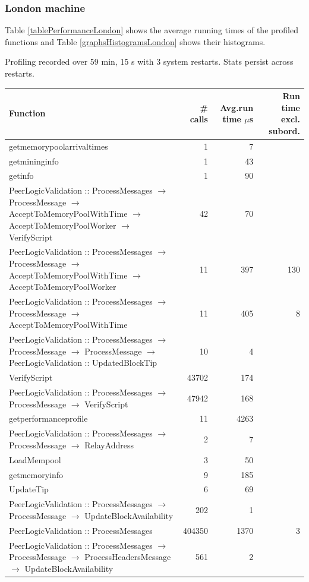 \documentclass{article}
\begin{document}
\subsubsection{London machine}
Table  \ref{tablePerformanceLondon} shows the average running times of the profiled functions and Table \ref{graphsHistogramsLondon} shows their histograms.
\begin{table}
	Profiling recorded over 59 min, 15 s with 3 system restarts. Stats persist across restarts.
	
	\begin{longtable}{P{8cm}|r|r|r}
		Function&\# calls& Avg.run time $\mu$s& Run time excl. subord. \\\hline
		getmemorypoolarrivaltimes& 1& 7&\\\hline
		getmininginfo& 1& 43&\\\hline
		getinfo& 1& 90&\\\hline
		PeerLogicValidation :: ProcessMessages $\to$ ProcessMessage $\to$ AcceptToMemoryPoolWithTime $\to$ AcceptToMemoryPoolWorker $\to$ VerifyScript& 42& 70&\\\hline
		PeerLogicValidation :: ProcessMessages $\to$ ProcessMessage $\to$ AcceptToMemoryPoolWithTime $\to$ AcceptToMemoryPoolWorker& 11& 397&130\\\hline
		PeerLogicValidation :: ProcessMessages $\to$ ProcessMessage $\to$ AcceptToMemoryPoolWithTime& 11& 405&8\\\hline
		PeerLogicValidation :: ProcessMessages $\to$ ProcessMessage $\to$ ProcessMessage $\to$ PeerLogicValidation :: UpdatedBlockTip& 10& 4&\\\hline
		VerifyScript& 43702& 174&\\\hline
		PeerLogicValidation :: ProcessMessages $\to$ ProcessMessage $\to$ VerifyScript& 47942& 168&\\\hline
		getperformanceprofile& 11& 4263&\\\hline
		PeerLogicValidation :: ProcessMessages $\to$ ProcessMessage $\to$ RelayAddress& 2& 7&\\\hline
		LoadMempool& 3& 50&\\\hline
		getmemoryinfo& 9& 185&\\\hline
		UpdateTip& 6& 69&\\\hline
		PeerLogicValidation :: ProcessMessages $\to$ ProcessMessage $\to$ UpdateBlockAvailability& 202& 1&\\\hline
		PeerLogicValidation :: ProcessMessages& 404350& 1370&3\\\hline
		PeerLogicValidation :: ProcessMessages $\to$ ProcessMessage $\to$ ProcessHeadersMessage $\to$ UpdateBlockAvailability& 561& 2&\\\hline

\end{longtable}
\end{table}
\end{document}
